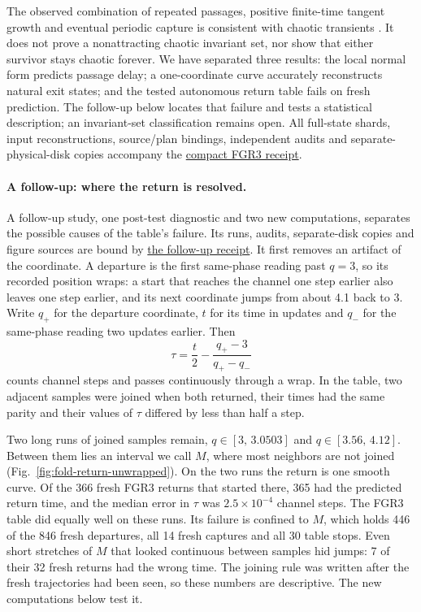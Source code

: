 \documentclass[11pt,letterpaper]{article}
\begin{document}
The observed combination of repeated passages, positive finite-time tangent growth and eventual periodic
capture is consistent with chaotic transients \cite{lai2011transient}. It does not prove a nonattracting
chaotic invariant set, nor show that either survivor stays chaotic forever. We have separated three results:
the local normal form predicts passage delay; a one-coordinate curve accurately reconstructs natural exit
states; and the tested autonomous return table fails on fresh prediction. The follow-up below locates that
failure and tests a statistical description; an invariant-set classification remains open. All full-state shards, input reconstructions,
source/plan bindings, independent audits and separate-physical-disk copies accompany the
\href{https://github.com/tdj28/neural-shrimp/blob/6343dc481f275afcb73b81b338a1597cbf2f21ed/docs/fold-return-autonomous.json}{compact FGR3 receipt}.

\paragraph{A follow-up: where the return is resolved.}
A follow-up study, one post-test diagnostic and two new computations, separates the possible causes of the table's
failure. Its runs, audits, separate-disk copies and figure sources are bound by
\href{https://github.com/tdj28/neural-shrimp/blob/bfdb26eb7b7e2b7998fe345d2f18777e2f6f6f97/docs/fold-return-followup.json}{the follow-up receipt}.
It first removes an artifact of the coordinate. A departure is the first same-phase reading past $q=3$, so its
recorded position wraps: a start that reaches the channel one step earlier also leaves one step earlier, and its
next coordinate jumps from about 4.1 back to 3. Write $q_+$ for the departure coordinate, $t$ for its time in
updates and $q_-$ for the same-phase reading two updates earlier. Then
\begin{equation}
 \tau=\frac{t}{2}-\frac{q_+-3}{q_+-q_-}
 \label{eq:unwrapped-return}
\end{equation}
counts channel steps and passes continuously through a wrap. In the table, two adjacent samples were joined when
both returned, their times had the same parity and their values of $\tau$ differed by less than half a step.

Two long runs of joined samples remain, $q\in[3,\,3.0503]$ and $q\in[3.56,\,4.12]$. Between them lies an interval
we call $M$, where most neighbors are not joined (Fig.~\ref{fig:fold-return-unwrapped}). On the two runs the
return is one smooth curve. Of the 366 fresh FGR3 returns that started there, 365 had the predicted return time,
and the median error in $\tau$ was $2.5\times10^{-4}$ channel steps. The FGR3 table did equally well on these runs.
Its failure is confined to $M$, which holds 446 of the 846 fresh departures, all 14 fresh captures and all 30 table
stops. Even short stretches of $M$ that looked continuous between samples hid jumps: 7 of their 32 fresh returns
had the wrong time. The joining rule was written after the fresh trajectories had been seen, so these numbers are
descriptive. The new computations below test it.
\end{document}
